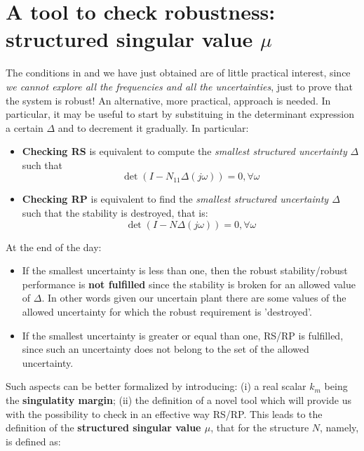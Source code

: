 \documentclass[a4paper, 12pt]{article}
\begin{document}
\section{A tool to check robustness: structured singular value $\mu$}
The conditions in  and  we have just obtained are of little practical interest, since \textit{we cannot explore all the frequencies and all the uncertainties}, just to prove that the system is robust! An alternative, more practical, approach is needed. In particular, it may be useful to start by substituing in the determinant expression a certain $\Delta$ and to decrement it gradually. In particular: 
\begin{itemize}
    \itemsep-0.3em
    \item \textbf{Checking RS} is equivalent to compute the \textit{smallest structured uncertainty} $\Delta$ such that 
    \begin{equation}
        \det(I-N_{11}\Delta(j\omega))=0, \forall \omega
    \end{equation}
    \item \textbf{Checking RP} is equivalent to find the \textit{smallest structured uncertainty $\Delta$} such that the stability is destroyed, that is: 
    \begin{equation}
        \det(I-N\Delta(j\omega))=0, \forall \omega
    \end{equation}
\end{itemize}
At the end of the day:
\begin{itemize}
    \item If the smallest uncertainty is less than one, then the robust stability/robust performance is \textbf{not fulfilled} since the stability is broken for an allowed value of $\Delta$. In other words given our uncertain plant there are some values of the allowed uncertainty for which the robust requirement is 'destroyed'.
    \item If the smallest uncertainty is greater or equal than one, RS/RP is fulfilled, since such an uncertainty does not belong to the set of the allowed uncertainty.
\end{itemize}

\noindent
Such aspects can be better formalized by introducing: (i) a real scalar $k_m$ being the \textbf{singulatity margin}; (ii) the definition of a novel tool which will provide us with the possibility to check in an effective way RS/RP. This leads to the definition of the \textbf{structured singular value $\mu$}, that for the structure $N$, namely, is defined as:
\end{document}
